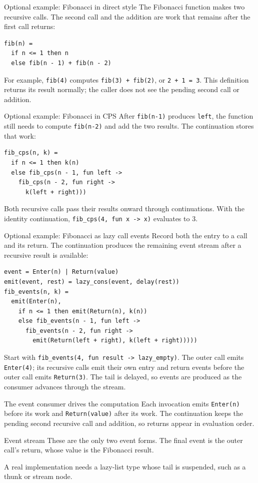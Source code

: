 \documentclass[aspectratio=169,10pt]{beamer}
\begin{document}
\begin{frame}[fragile]{Optional example: Fibonacci in direct style}
  The Fibonacci function makes two recursive calls. The second call and the
  addition are work that remains after the first call returns:
  \begin{lstlisting}
fib(n) =
  if n <= 1 then n
  else fib(n - 1) + fib(n - 2)
  \end{lstlisting}
  For example, \texttt{fib(4)} computes \texttt{fib(3) + fib(2)}, or
  \texttt{2 + 1 = 3}. This definition returns its result normally; the caller
  does not see the pending second call or addition.
\end{frame}

\begin{frame}[fragile]{Optional example: Fibonacci in CPS}
  After \texttt{fib(n-1)} produces \texttt{left}, the function still needs
  to compute \texttt{fib(n-2)} and add the two results. The continuation stores
  that work:
  \begin{lstlisting}
fib_cps(n, k) =
  if n <= 1 then k(n)
  else fib_cps(n - 1, fun left ->
    fib_cps(n - 2, fun right ->
      k(left + right)))
  \end{lstlisting}
  Both recursive calls pass their results onward through continuations. With
  the identity continuation, \texttt{fib\_cps(4, fun x -> x)} evaluates to 3.
\end{frame}
\begin{frame}[fragile]{Optional example: Fibonacci as lazy call events}
  Record both the entry to a call and its return. The continuation produces
  the remaining event stream after a recursive result is available:
  \begin{lstlisting}
event = Enter(n) | Return(value)
emit(event, rest) = lazy_cons(event, delay(rest))
fib_events(n, k) =
  emit(Enter(n),
    if n <= 1 then emit(Return(n), k(n))
    else fib_events(n - 1, fun left ->
      fib_events(n - 2, fun right ->
        emit(Return(left + right), k(left + right)))))
  \end{lstlisting}
  Start with \texttt{fib\_events(4, fun result -> lazy\_empty)}. The outer
  call emits \texttt{Enter(4)}; its recursive calls emit their own entry and
  return events before the outer call emits \texttt{Return(3)}. The tail is
  delayed, so events are produced as the consumer advances through the stream.
\end{frame}

\begin{frame}{The event consumer drives the computation}
  Each invocation emits \texttt{Enter(n)} before its work and
  \texttt{Return(value)} after its work. The continuation keeps the pending
  second recursive call and addition, so returns appear in evaluation order.
  \begin{block}{Event stream}
    These are the only two event forms. The final event is the outer call's
    return, whose value is the Fibonacci result.
  \end{block}
  A real implementation needs a lazy-list type whose tail is suspended, such
  as a thunk or stream node.
\end{frame}
\end{document}
